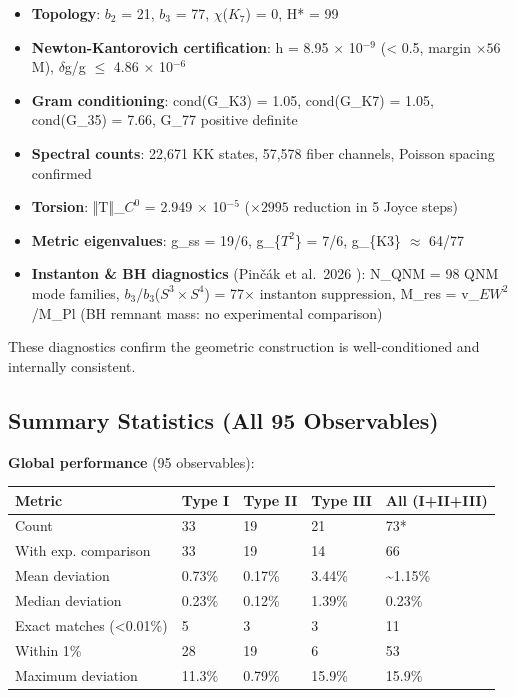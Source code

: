 \documentclass[11pt,a4paper]{article}
\begin{document}
\begin{itemize}

\item
  \textbf{Topology}: \(b_{2}\) = 21, \(b_{3}\) = 77, \(\chi\)(\(K_{7}\))
  = 0, H* = 99
\item
  \textbf{Newton-Kantorovich certification}: h = 8.95 \(\times\)
  10\(^{-9}\) (\textless{} 0.5, margin \(\times 56\)M), \(\delta\)g/g
  \(\leq\) 4.86 \(\times\) 10\(^{-6}\)
\item
  \textbf{Gram conditioning}: cond(G\_K3) = 1.05, cond(G\_K7) = 1.05,
  cond(G\_35) = 7.66, G\_77 positive definite
\item
  \textbf{Spectral counts}: 22,671 KK states, 57,578 fiber channels,
  Poisson spacing confirmed
\item
  \textbf{Torsion}: ‖T‖\_\(C^{0}\) = 2.949 \(\times\) 10\(^{-5}\)
  (\(\times 2995\) reduction in 5 Joyce steps)
\item
  \textbf{Metric eigenvalues}: g\_ss = 19/6, g\_\{\(T^{2}\)\} = 7/6,
  g\_\{K3\} \(\approx\) 64/77
\item
  \textbf{Instanton \& BH diagnostics} (Pinčák et al.~2026 \cite{42}):
  N\_QNM = 98 QNM mode families,
  \(b_{3}\)/\(b_{3}\)(\(S^{3} \times S^{4}\)) = 77\(\times\) instanton
  suppression, M\_res = v\_\(EW^{2}\)/M\_Pl (BH remnant mass: no
  experimental comparison)
\end{itemize}

These diagnostics confirm the geometric construction is well-conditioned
and internally consistent.

\subsection{Summary Statistics (All 95 Observables)}

\textbf{Global performance} (95 observables):

\begin{longtable}[]{@{}lllll@{}}
\toprule\noalign{}
Metric & Type I & Type II & Type III & All (I+II+III) \\
\midrule\noalign{}
\endhead
\bottomrule\noalign{}
\endlastfoot
Count & 33 & 19 & 21 & 73* \\
With exp. comparison & 33 & 19 & 14 & 66 \\
Mean deviation & 0.73\% & 0.17\% & 3.44\% & \textasciitilde1.15\% \\
Median deviation & 0.23\% & 0.12\% & 1.39\% & 0.23\% \\
Exact matches (\textless0.01\%) & 5 & 3 & 3 & 11 \\
Within 1\% & 28 & 19 & 6 & 53 \\
Maximum deviation & 11.3\% & 0.79\% & 15.9\% & 15.9\% \\
\end{longtable}
\end{document}

